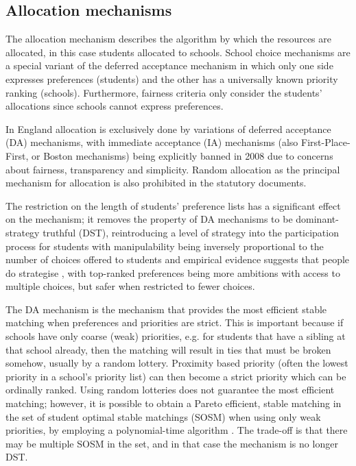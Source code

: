 \documentclass{article}
\begin{document}
\begin{multicols}{2}
\subsection{Allocation mechanisms}
The allocation mechanism describes the algorithm by which the resources are allocated, in this case students allocated to schools. School choice mechanisms are a special variant of the deferred acceptance mechanism in which only one side expresses preferences (students) and the other has a universally known priority ranking (schools). Furthermore, fairness criteria only consider the students' allocations since schools cannot express preferences. 

In England allocation is exclusively done by variations of deferred acceptance (DA) mechanisms, with immediate acceptance (IA) mechanisms (also First-Place-First, or Boston mechanisms) being explicitly banned in 2008 \cite{pathakSchoolAdmissionsReform2013,terrierImmediateAcceptanceDeferred} due to concerns about fairness, transparency and simplicity. Random allocation as the principal mechanism for allocation is also prohibited in the statutory documents. 

The restriction on the length of students' preference lists has a significant effect on the mechanism; it removes the property of DA mechanisms to be dominant-strategy truthful (DST), reintroducing a level of strategy into the participation process for students \cite{haeringerConstrainedSchoolChoice2009} with manipulability being inversely proportional to the number of choices offered to students \cite{pathakSchoolAdmissionsReform2013} and empirical evidence suggests that people do strategise \cite{burgessSchoolChoiceEngland2019}, with top-ranked preferences being more ambitions with access to multiple choices, but safer when restricted to fewer choices. 

The DA mechanism is the mechanism that provides the most efficient stable matching when preferences and priorities are strict. This is important because if schools have only coarse (weak) priorities, e.g. for students that have a sibling at that school already, then the matching will result in ties that must be broken somehow, usually by a random lottery. Proximity based priority (often the lowest priority in a school's priority list) can then become a strict priority which can be ordinally ranked. Using random lotteries does not guarantee the most efficient matching; however, it is possible to obtain a Pareto efficient, stable matching in the set of student optimal stable matchings (SOSM) when using only weak priorities, by employing a polynomial-time algorithm \cite{erdilWhatsMatterTieBreaking2008}. The trade-off is that there may be multiple SOSM in the set, and in that case the mechanism is no longer DST. %


\end{multicols}
\end{document}
